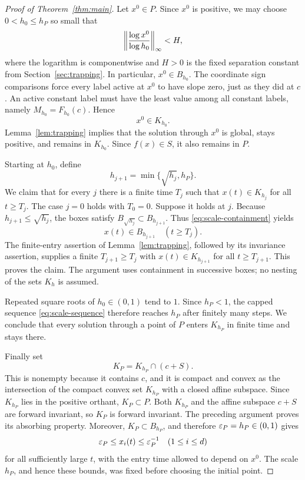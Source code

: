 \begin{proof}[Proof of Theorem~\ref{thm:main}]
Let $x^0\in P$. Since $x^0$ is positive, we may choose
$0<h_0\leq h_P$ so small that
\[
 \left\|\frac{\log x^0}{\log h_0}\right\|_\infty<H,
\]
where the logarithm is componentwise and $H>0$ is the fixed separation
constant from Section~\ref{sec:trapping}. In particular, $x^0\in B_{h_0}$.
The coordinate sign comparisons force every label active at $x^0$ to
have slope zero, just as they did at $c$. An active constant label
must have the least value among all constant labels, namely
$M_{h_0}=F_{h_0}(c)$. Hence
\[
 x^0\in K_{h_0}.
\]
Lemma~\ref{lem:trapping} implies that the solution through $x^0$ is
global, stays positive, and remains in $K_{h_0}$. Since $f(x)\in S$,
it also remains in $P$.

Starting at $h_0$, define
\begin{equation}\label{eq:scale-sequence}
 h_{j+1}=\min\{\sqrt{h_j},h_P\}.
\end{equation}
We claim that for every $j$ there is a finite time $T_j$ such that
$x(t)\in K_{h_j}$ for all $t\geq T_j$. The case $j=0$ holds with
$T_0=0$. Suppose it holds at $j$. Because
$h_{j+1}\leq\sqrt{h_j}$, the boxes satisfy
$B_{\sqrt{h_j}}\subset B_{h_{j+1}}$. Thus
\eqref{eq:scale-containment} yields
\[
 x(t)\in B_{h_{j+1}}\quad(t\geq T_j).
\]
The finite-entry assertion of Lemma~\ref{lem:trapping}, followed by
its invariance assertion, supplies a finite $T_{j+1}\geq T_j$ with
$x(t)\in K_{h_{j+1}}$ for all $t\geq T_{j+1}$. This proves the claim.
The argument uses containment in successive boxes; no nesting of the
sets $K_h$ is assumed.

Repeated square roots of $h_0\in(0,1)$ tend to $1$. Since $h_P<1$,
the capped sequence \eqref{eq:scale-sequence} therefore reaches $h_P$
after finitely many steps. We conclude that every solution through a
point of $P$ enters $K_{h_P}$ in finite time and stays there.

Finally set
\[
 K_P=K_{h_P}\cap(c+S).
\]
This is nonempty because it contains $c$, and it is compact and convex
as the intersection of the compact convex set $K_{h_P}$ with a closed
affine subspace. Since $K_{h_P}$ lies in the positive orthant, $K_P\subset P$.
Both $K_{h_P}$ and the affine subspace $c+S$ are forward invariant, so
$K_P$ is forward invariant. The preceding argument proves its absorbing
property. Moreover, $K_P\subset B_{h_P}$, and therefore
$\varepsilon_P=h_P\in(0,1)$ gives
\[
 \varepsilon_P\leq x_i(t)\leq\varepsilon_P^{-1}
 \quad(1\leq i\leq d)
\]
for all sufficiently large $t$, with the entry time allowed to depend
on $x^0$. The scale $h_P$, and hence these bounds, was fixed before
choosing the initial point.
\end{proof}

